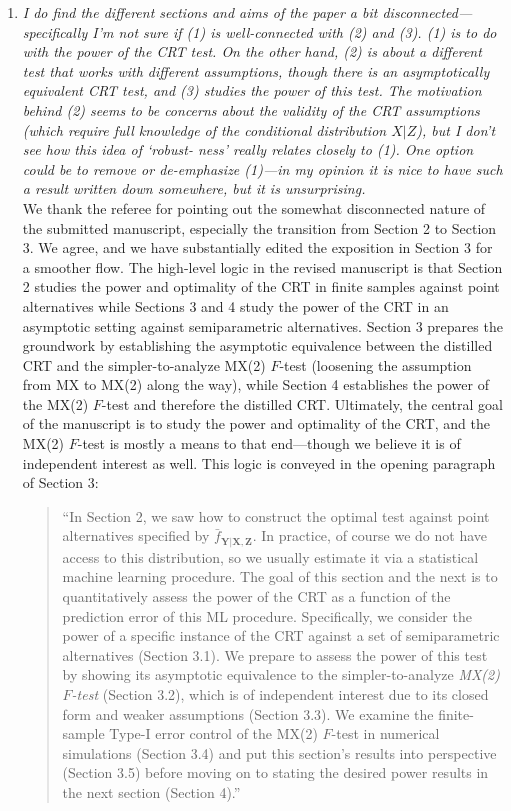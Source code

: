 \documentclass[12pt]{article}
\begin{document}
\begin{enumerate}
	\item \textsl{I do find the different sections and aims of the paper a bit disconnected— specifically I’m not sure if (1) is well-connected with (2) and (3). (1) is to do with the power of the CRT test. On the other hand, (2) is about a different test that works with different assumptions, though there is an asymptotically equivalent CRT test, and (3) studies the power of this test. The motivation behind (2) seems to be concerns about the validity of the CRT assumptions (which require full knowledge of the conditional distribution $X|Z$), but I don’t see how this idea of ‘robust- ness’ really relates closely to (1). One option could be to remove or de-emphasize (1)—in my opinion it is nice to have such a result written down somewhere, but it is unsurprising.}\\
	
	We thank the referee for pointing out the somewhat disconnected nature of the submitted manuscript, especially the transition from Section 2 to Section 3. We agree, and we have substantially edited the exposition in Section 3 for a smoother flow. The high-level logic in the revised manuscript is that Section 2 studies the power and optimality of the CRT in finite samples against point alternatives while Sections 3 and 4 study the power of the CRT in an asymptotic setting against semiparametric alternatives. Section 3 prepares the groundwork by establishing the asymptotic equivalence between the distilled CRT and the simpler-to-analyze MX(2) $F$-test (loosening the assumption from MX to MX(2) along the way), while Section 4 establishes the power of the MX(2) $F$-test and therefore the distilled CRT. Ultimately, the central goal of the manuscript is to study the power and optimality of the CRT, and the MX(2) $F$-test is mostly a means to that end---though we believe it is of independent interest as well. This logic is conveyed in the opening paragraph of Section 3:
	
	\begin{quote}
		``In Section 2, we saw how to construct the optimal test against point alternatives specified by $\bar f_{\bm Y| \bm X, \bm Z}$. In practice, of course we do not have access to this distribution, so we usually estimate it via a statistical machine learning procedure. The goal of this section and the next is to quantitatively assess the power of the CRT as a function of the prediction error of this ML procedure. Specifically, we consider  the power of a specific instance of the CRT against a set of semiparametric alternatives (Section 3.1). We prepare to assess the power of this test by showing its asymptotic equivalence to the simpler-to-analyze \textit{MX(2) $F$-test} (Section 3.2), which is of independent interest due to its closed form and weaker assumptions (Section 3.3). We examine the finite-sample Type-I error control of the MX(2) $F$-test in numerical simulations (Section 3.4) and put this section's results into perspective (Section 3.5) before moving on to stating the desired power results in the next section (Section 4).''
	\end{quote}
	 	

\end{enumerate}
\end{document}
